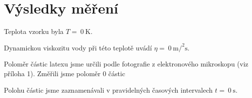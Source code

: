 \section*{Výsledky měření}
Teplota vzorku byla $T =~\SI{0}{\kelvin}$.

Dynamickou viskozitu vody při této teplotě uvádí \cite{viskozita} $\eta=~\SI{0}{\m\square\per\s}$.

Poloměr částic latexu jsme určili podle fotografie z elektronového mikroskopu (viz příloha 1).
Změřili jsme poloměr \num{0} částic

Polohu částic jsme zaznamenávali v pravidelných časových intervalech $t=~\SI{0}{\s}$.

